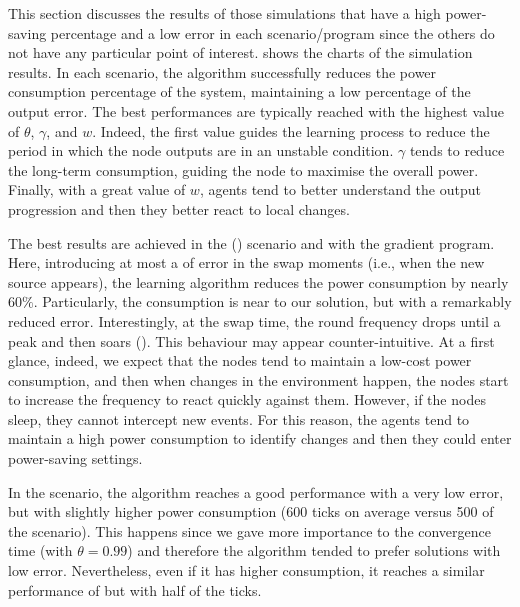 This section discusses the results of 
 those simulations that have a high power-saving percentage
 and a low error in each scenario/program
 since the others do not have any particular point of interest. 
%
 shows the charts of the simulation results.
%
In each scenario, the algorithm successfully 
 reduces the power consumption percentage of the system, 
 maintaining a low percentage of the output error. 
%
 The best performances are typically reached with the highest value of $\theta$, $\gamma$, and $w$.
%
Indeed, the first value guides the learning process 
 to reduce the period in which the node outputs are in an unstable condition. 
%
$\gamma$ tends to reduce the long-term consumption, 
 guiding the node to maximise the overall power.
% 
Finally, with a great value of $w$, 
 agents tend to better understand the output progression and then they better react to local changes. 

The best results are achieved in the \swapscen{} ()
 scenario and with the gradient program. 
 Here, introducing at most a  of error in the swap moments 
 (i.e., when the new source appears), 
 the learning algorithm reduces the power consumption by nearly 60$\%$.
%
Particularly, the consumption is near to our \adhocsol{} solution, 
 but with a remarkably reduced error. 
%
Interestingly, at the swap time, the round frequency drops until a peak and then soars ().
This behaviour may appear counter-intuitive.
 At a first glance, indeed, we expect that the nodes tend to maintain a low-cost power consumption, 
 and then when changes in the environment happen, 
 the nodes start to increase the frequency to react quickly against them.
%
However, if the nodes sleep, they cannot intercept new events. 
 For this reason, the agents tend to maintain a high power 
 consumption to identify changes and then they could enter power-saving settings.%

In the \multiswap{} scenario, 
 the algorithm reaches a good performance with a very low error, 
 but with slightly higher power consumption (600 ticks on average versus 500 of the \swapscen{} scenario). 
%
This happens since we gave more importance to the convergence time 
 (with $\theta = 0.99$) and therefore the algorithm tended 
 to prefer solutions with low error. %
%
Nevertheless, even if it has higher consumption, 
 it reaches a similar performance of \periodicsol{} but with half of the ticks.
%

